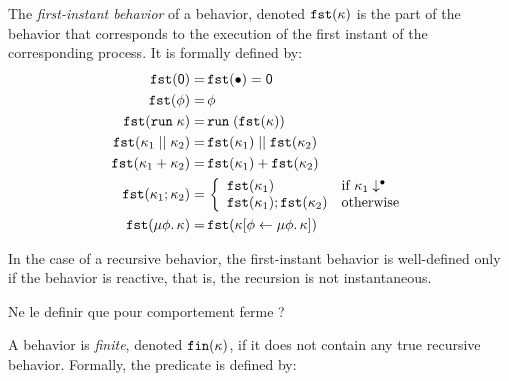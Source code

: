 \documentclass[9pt,preprint]{sigplanconf}
\newcommand{\todo}[1]{ {\color{red} #1}}
\begin{document}
\begin{definition}
The \emph{first-instant behavior} of a behavior, denoted $\mathtt{fst}(\kappa)$ is the part of the behavior that corresponds to the execution of the first instant of the corresponding process. It is formally defined by:
\begin{align*}
\mathtt{fst}(\textsf{0}) =&\, \mathtt{fst}(\bullet)  = \textsf{0} \\
\mathtt{fst}(\phi) =&\, \phi \\
\mathtt{fst}(\mathtt{run}\; \kappa) =&\, \mathtt{run}\; (\mathtt{fst}(\kappa)) \\ 
\mathtt{fst}(\kappa_1 \mid\mid \kappa_2) =&\, \mathtt{fst}(\kappa_1) \mid\mid \mathtt{fst}(\kappa_2) \\
\mathtt{fst}(\kappa_1 + \kappa_2) =&\, \mathtt{fst}(\kappa_1) + \mathtt{fst}(\kappa_2) \\
\mathtt{fst}(\kappa_1 ; \kappa_2) =&\, 
		\left\{ \begin{array}{ll}  
				\mathtt{fst}(\kappa_1) & \text{if } \kappa_1\downarrow^{\bullet} \\
				\mathtt{fst}(\kappa_1) ; \mathtt{fst}(\kappa_2) &\text{otherwise} 
		\end{array}\right. \\
\mathtt{fst}(\mu \phi.\, \kappa) =&\, \mathtt{fst}(\kappa[\phi \leftarrow \mu \phi.\, \kappa])
\end{align*}
\end{definition}
In the case of a recursive behavior,  the first-instant behavior is well-defined only if the behavior is reactive, that is, the recursion is not instantaneous.

\todo{Ne le definir que pour comportement ferme ?}
\begin{definition}
A behavior is \emph{finite}, denoted $\mathtt{fin}(\kappa)$, if it does not contain any true recursive behavior. Formally, the predicate is defined by:
\end{definition}
\end{document}
